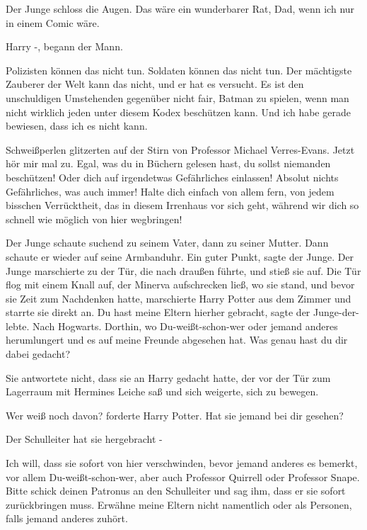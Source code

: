 Der Junge schloss die Augen. \glqq{}Das wäre ein wunderbarer Rat, Dad, wenn ich
nur in einem Comic wäre.\grqq{}

\glqq{}Harry -\grqq{}, begann der Mann.

\glqq{}Polizisten können das nicht tun. Soldaten können das nicht tun. Der
mächtigste Zauberer der Welt kann das nicht, und er hat es versucht. Es ist den
unschuldigen Umstehenden gegenüber nicht fair, Batman zu spielen, wenn man nicht
wirklich jeden unter diesem Kodex beschützen kann. Und ich habe gerade bewiesen,
dass ich es nicht kann.\grqq{}

Schweißperlen glitzerten auf der Stirn von Professor Michael Verres-Evans. \glqq{}
Jetzt hör mir mal zu. Egal, was du in Büchern gelesen hast, du sollst niemanden
beschützen! Oder dich auf irgendetwas Gefährliches einlassen! Absolut nichts
Gefährliches, was auch immer! Halte dich einfach von allem fern, von jedem
bisschen Verrücktheit, das in diesem Irrenhaus vor sich geht, während wir dich
so schnell wie möglich von hier wegbringen!\grqq{}

Der Junge schaute suchend zu seinem Vater, dann zu seiner Mutter. Dann schaute
er wieder auf seine Armbanduhr. \glqq{}Ein guter Punkt\grqq{}, sagte der Junge.
Der Junge marschierte zu der Tür, die nach draußen führte, und stieß sie auf.
Die Tür flog mit einem Knall auf, der Minerva aufschrecken ließ, wo sie stand,
und bevor sie Zeit zum Nachdenken hatte, marschierte Harry Potter aus dem Zimmer
und starrte sie direkt an. \glqq{}Du hast meine Eltern hierher gebracht\grqq{},
sagte der Junge-der-lebte. \glqq{}Nach Hogwarts. Dorthin, wo Du-weißt-schon-wer
oder jemand anderes herumlungert und es auf meine Freunde abgesehen hat. Was
genau hast du dir dabei gedacht?\grqq{}

Sie antwortete nicht, dass sie an Harry gedacht hatte, der vor der Tür zum
Lagerraum mit Hermines Leiche saß und sich weigerte, sich zu bewegen.

\glqq{}Wer weiß noch davon?\grqq{} forderte Harry Potter. \glqq{}Hat sie jemand
bei dir gesehen?\grqq{}

\glqq{}Der Schulleiter hat sie hergebracht -\grqq{}

\glqq{}Ich will, dass sie sofort von hier verschwinden, bevor jemand anderes es
bemerkt, vor allem Du-weißt-schon-wer, aber auch Professor Quirrell oder
Professor Snape. Bitte schick deinen Patronus an den Schulleiter und sag ihm,
dass er sie sofort zurückbringen muss. Erwähne meine Eltern nicht namentlich
oder als Personen, falls jemand anderes zuhört.\grqq{}

